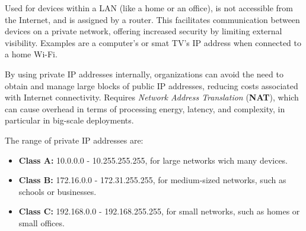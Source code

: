 Used for devices within a LAN (like a home or an office), is not accessible from the Internet, and is assigned by a router. This facilitates communication between devices on a private network, offering increased security by limiting external visibility. Examples are a computer's or smat TV's IP address when connected to a home Wi-Fi.

By using private IP addresses internally, organizations can avoid the need to obtain and manage large blocks of public IP addresses, reducing costs associated with Internet connectivity. Requires \textit{Network Address Translation} (\textbf{NAT}), which can cause overhead in terms of processing energy, latency, and complexity, in particular in big-scale deployments.

The range of private IP addresses are:

\begin{itemize}
  \item \textbf{Class A:} 10.0.0.0 - 10.255.255.255, for large networks wich many devices.
  \item \textbf{Class B:} 172.16.0.0 - 172.31.255.255, for medium-sized networks, such as schools or businesses.
  \item \textbf{Class C:} 192.168.0.0 - 192.168.255.255, for small networks, such as homes or small offices.
\end{itemize}

